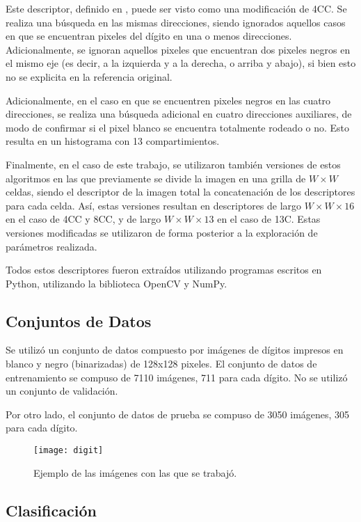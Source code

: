 \documentclass[12pt]{article}
\begin{document}
Este descriptor, definido en \cite{bins}, puede ser visto como una modificación
de 4CC. Se realiza una búsqueda en las mismas direcciones, siendo ignorados
aquellos casos en que se encuentran pixeles del dígito en una o menos
direcciones. Adicionalmente, se ignoran aquellos pixeles que encuentran dos
pixeles negros en el mismo eje (es decir, a la izquierda y a la derecha, o
arriba y abajo), si bien esto no se explicita en la referencia original. 

Adicionalmente, en el caso en que se encuentren pixeles negros en las cuatro
direcciones, se realiza una búsqueda adicional en cuatro direcciones auxiliares,
de modo de confirmar si el pixel blanco se encuentra totalmente rodeado o no.
Esto resulta en un histograma con 13 compartimientos.

Finalmente, en el caso de este trabajo, se utilizaron también versiones de estos
algoritmos en las que previamente se divide la imagen en una grilla de $W \times
W$ celdas, siendo el descriptor de la imagen total la concatenación de los
descriptores para cada celda. Así, estas versiones resultan en descriptores de
largo $W \times W \times 16$ en el caso de 4CC y 8CC, y de largo $W \times W
\times 13$ en el caso de 13C. Estas versiones modificadas se utilizaron de forma
posterior a la exploración de parámetros realizada.

Todos estos descriptores fueron extraídos utilizando programas escritos en
Python, utilizando la biblioteca OpenCV y NumPy.

\subsection{Conjuntos de Datos}

Se utilizó un conjunto de datos compuesto por imágenes de dígitos impresos en
blanco y negro (binarizadas) de 128x128 pixeles. El conjunto de datos de
entrenamiento se compuso de 7110 imágenes, 711 para cada dígito. No se utilizó
un conjunto de validación.

Por otro lado, el conjunto de datos de prueba se compuso de 3050 imágenes, 305
para cada dígito. 

\begin{figure}[h]
    \centering
    \texttt{[image: digit]}
\caption{Ejemplo de las imágenes con las que se trabajó.}
\end{figure}

\subsection{Clasificación}
\end{document}
